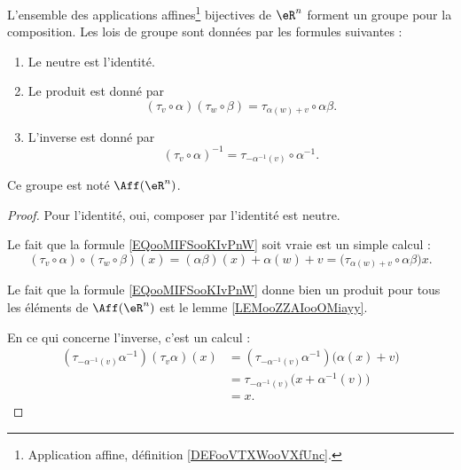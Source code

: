 \begin{propositionDef}      \label{PROPooBPKKooJRAMeT}
	L'ensemble des applications affines\footnote{Application affine, définition \ref{DEFooVTXWooVXfUnc}.} bijectives de \( \eR^n\) forment un groupe pour la composition. Les lois de groupe sont données par les formules suivantes :
	\begin{enumerate}
		\item
		      Le neutre est l'identité.
		\item       \label{ITEMooGUFRooMuhXds}
		      Le produit est donné par
		      \begin{equation}        \label{EQooMIFSooKIvPnW}
			      (\tau_v\circ \alpha)(\tau_w\circ \beta)=\tau_{\alpha(w)+v}\circ \alpha\beta.
		      \end{equation}
		\item       \label{ITEMooYOMSooRUDSdm}
		      L'inverse est donné par
		      \begin{equation}
			      (\tau_v\circ\alpha)^{-1}=\tau_{-\alpha^{-1}(v)}\circ \alpha^{-1}.
		      \end{equation}
	\end{enumerate}
	Ce groupe est noté \( \Aff(\eR^n)\).
\end{propositionDef}

\begin{proof}
	Pour l'identité, oui, composer par l'identité est neutre.

	Le fait que la formule \eqref{EQooMIFSooKIvPnW} soit vraie est un simple calcul :
	\begin{equation}
		(\tau_v\circ\alpha)\circ(\tau_w\circ\beta)(x)=(\alpha\beta)(x)+\alpha(w)+v=\big( \tau_{\alpha(w)+v}\circ \alpha\beta\big)x.
	\end{equation}

	Le fait que la formule \eqref{EQooMIFSooKIvPnW} donne bien un produit pour tous les éléments de \( \Aff(\eR^n)\) est le lemme \ref{LEMooZZAIooOMiayy}.

	En ce qui concerne l'inverse, c'est un calcul :
	\begin{subequations}
		\begin{align}
			(\tau_{-\alpha^{-1}(v)}\alpha^{-1})(\tau_v\alpha)(x) & =(\tau_{-\alpha^{-1}(v)}\alpha^{-1})\big( \alpha(x)+v \big) \\
			                                                     & =\tau_{-\alpha^{-1}(v)}\big( x+\alpha^{-1}(v) \big)         \\
			                                                     & =x.
		\end{align}
	\end{subequations}
\end{proof}

